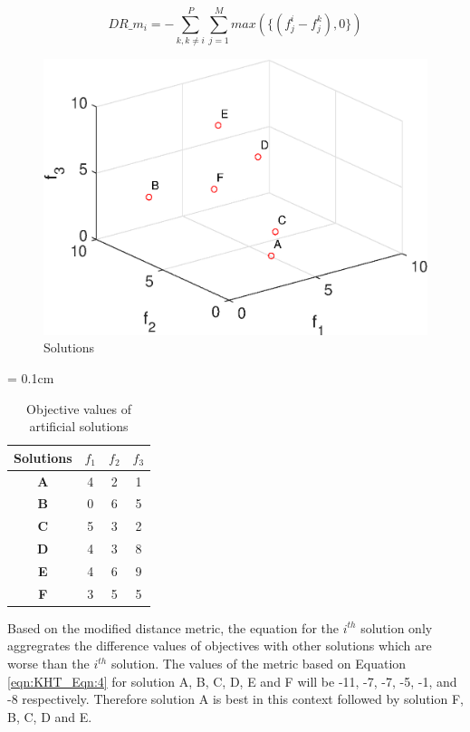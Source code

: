 \documentclass{sig-alternate}
\begin{document}
	\begin{equation}
	DR\_m_i = -\sum_{k,k\neq i}^P\sum_{j=1}^M max(\{(f^i_j - f^k_j),0\}) 
	\label{eqn:KHT_Eqn:4}
	\end{equation}
	
	\begin{figure}[!htb]
		\centering
		\includegraphics[width=.4\textwidth]{Figures/drexp.eps}
		\caption{Solutions}
		\label{fig:drexp}
	\end{figure}
	
	\begin{table}[!htb]\scriptsize
		\centering
		\renewcommand{\arraystretch}{0.9}
		\caption{Objective values of artificial solutions}
		\label{tab:Drexample2}
		\tabcolsep = 0.1cm
		\begin{tabular}{|c|c|c|c|}
		\hline
		\textbf{Solutions} & \textbf{$f_1$} & \textbf{$f_2$} & \textbf{$f_3$} \\ \hline
		\textbf{A}         & 4              & 2              & 1              \\ \hline
		\textbf{B}         & 0              & 6              & 5              \\ \hline
		\textbf{C}         & 5              & 3              & 2              \\ \hline
		\textbf{D}         & 4              & 3              & 8              \\ \hline
		\textbf{E}         & 4              & 6              & 9              \\ \hline
		\textbf{F}         & 3              & 5              & 5              \\ \hline
		\end{tabular}
	\end{table}	
	
Based on the modified distance metric, the equation for the $i^{th}$ solution only aggregrates the difference values of objectives with other solutions which are worse than the $i^{th}$ solution. The values of the metric based on Equation \ref{eqn:KHT_Eqn:4} for solution A, B, C, D, E and F will be -11, -7, -7, -5, -1, and -8 respectively. Therefore solution A is best in this context followed by solution F, B, C, D and E.
	
\end{document}
